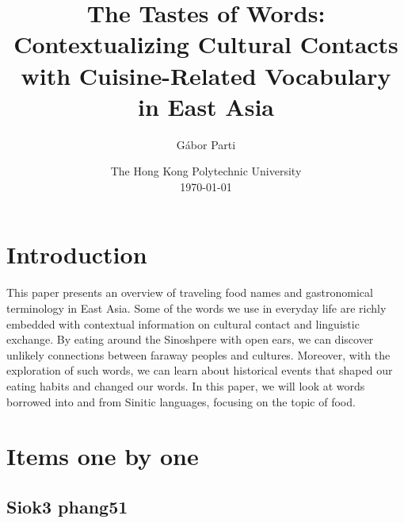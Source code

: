 \documentclass[12pt]{article}
\title{The Tastes of Words: Contextualizing Cultural Contacts with Cuisine-Related Vocabulary in East Asia}
\author{Gábor Parti {\small\orcid{0000-0003-2042-4655}}}
\date{The Hong Kong Polytechnic University\\[2.5ex]\today}
\begin{document}

\maketitle



\begin{abstract}

\end{abstract}


\section{Introduction}

This paper presents an overview of traveling food names and gastronomical terminology in East Asia. Some of the words we use in everyday life are richly embedded with contextual information on cultural contact and linguistic exchange. By eating around the Sinoshpere with open ears, we can discover unlikely connections between faraway peoples and cultures. Moreover, with the exploration of such words, we can learn about historical events that shaped our eating habits and changed our words. In this paper, we will look at words borrowed into and from Sinitic languages, focusing on the topic of food.

\section{Items one by one}

\subsection{Siok3 phang51}
\end{document}
